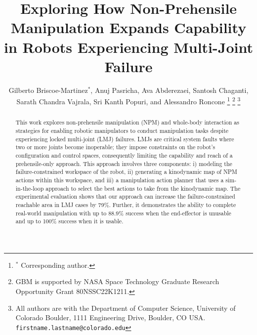 \documentclass[letterpaper, 10 pt, conference]{ieeeconf}  %
\title{\LARGE \bf
Exploring How Non-Prehensile Manipulation Expands Capability in Robots Experiencing Multi-Joint Failure
}
\author{Gilberto Briscoe-Martinez$^{*}$, Anuj Pasricha, Ava Abderezaei, Santosh Chaganti,\\ Sarath Chandra Vajrala, Sri Kanth Popuri, and Alessandro Roncone%
\thanks{$^{*}$ Corresponding author.}
\thanks{GBM is supported by NASA Space Technology Graduate Research
Opportunity Grant 80NSSC22K1211.}%
\thanks{All authors are with the Department of Computer Science, University of Colorado Boulder, 1111 Engineering Drive, Boulder, CO USA.
{\tt\small firstname.lastname@colorado.edu}}
}
\theoremstyle{definition}
\begin{document}
\maketitle
\thispagestyle{empty}
\pagestyle{empty}


\begin{abstract}
This work explores non-prehensile manipulation (NPM) and whole-body interaction as strategies for enabling robotic manipulators to conduct manipulation tasks despite experiencing locked multi-joint (LMJ) failures. LMJs are critical system faults where two or more joints become inoperable; they impose constraints on the robot's configuration and control spaces, consequently limiting the capability and reach of a prehensile-only approach. This approach involves three components: i) modeling the failure-constrained workspace of the robot, ii) generating a kinodynamic map of NPM actions within this workspace, and iii) a manipulation action planner that uses a sim-in-the-loop approach to select the best actions to take from the kinodynamic map. The experimental evaluation shows that our approach can increase the failure-constrained reachable area in LMJ cases by 79\%. Further, it demonstrates the ability to complete real-world manipulation with up to 88.9\% success when the end-effector is unusable and up to 100\% success when it is usable.
\end{abstract}


% 

% 

% 




\AtNextBibliography{\small}
\printbibliography
\end{document}
